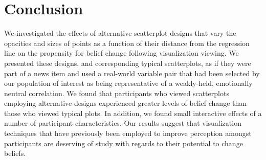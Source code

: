 \documentclass[manuscript,screen,review,anonymous]{acmart}
\begin{document}
\section{Conclusion}\label{sec-conclusion}

We investigated the effects of alternative scatterplot designs that vary
the opacities and sizes of points as a function of their distance from
the regression line on the propensity for belief change following
visualization viewing. We presented these designs, and corresponding
typical scatterplots, as if they were part of a news item and used a
real-world variable pair that had been selected by our population of
interest as being representative of a weakly-held, emotionally neutral
correlation. We found that participants who viewed scatterplots
employing alternative designs experienced greater levels of belief
change than those who viewed typical plots. In addition, we found small
interactive effects of a number of participant characteristics. Our
results suggest that visualization techniques that have previously been
employed to improve perception amongst participants are deserving of
study with regards to their potential to change beliefs.




\end{document}
